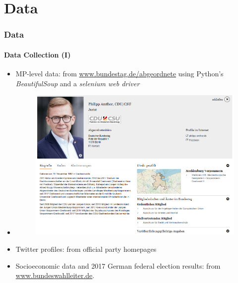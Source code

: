 \documentclass[xcolor=dvipsnames]{beamer}
\begin{document}
\section{Data}
\begin{frame}
\frametitle{Data}
\framesubtitle{Data Collection (I)}
\begin{itemize}
\item MP-level data: from \url{www.bundestag.de/abgeordnete} using Python's \textit{BeautifulSoup} and a \textit{selenium web driver} \cite{van1995python} \cite{richardson2007beautiful}
\item[] 
	\begin{figure}[h!]
  	\centering
  	\includegraphics[scale = 0.42]{../plots/presentation/amthor.png}
	\end{figure}
\item Twitter profiles: from official party homepages
\item Socioeconomic data and 2017 German federal election results: from \url{www.bundeswahlleiter.de}.
\end{itemize}
\end{frame}
\end{document}
